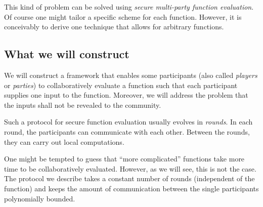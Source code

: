This kind of problem can be solved using \emph{secure multi-party function evaluation}. Of course one might tailor a specific scheme for each function. However, it is conceivably to derive one technique that allows for arbitrary functions.

\subsection{What we will construct}
\label{sec:our-goal}

We will construct a framework that enables some participants (also called \emph{players} or \emph{parties}) to collaboratively evaluate a function such that each participant supplies one input to the function. Moreover, we will address the problem that the inputs shall not be revealed to the community.

Such a protocol for secure function evaluation usually evolves in \emph{rounds}. In each round, the participants can communicate with each other. Between the rounds, they can carry out local computations.

One might be tempted to guess that ``more complicated'' functions take more time to be collaboratively evaluated. However, as we will see, this is not the case. The protocol we describe takes a constant number of rounds (independent of the function) and keeps the amount of communication between the single participants polynomially bounded.

